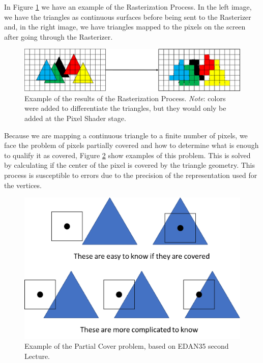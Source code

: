 \documentclass{cslthse-msc}
\begin{document}
In Figure \ref{fig:rasterizationproc} we have an example of the Rasterization Process. In the left image, we have the triangles as continuous surfaces before being sent to the Rasterizer and, in the right image, we have triangles mapped to the pixels on the screen after going through the Rasterizer.

\begin{figure}[!hbt]
	\centering
	\includegraphics[scale=0.75]{images/rasterization_process.png} 
	\caption{Example of the results of the Rasterization Process. 
		\emph{Note}: colors were added to differentiate the triangles, but they would only be added at the Pixel Shader stage.
	}\label{fig:rasterizationproc}
\end{figure}

Because we are mapping a continuous triangle to a finite number of pixels, we face the problem of pixels partially covered and how to determine what is enough to qualify it as covered, Figure \ref{fig:partialcover} show examples of this problem. This is solved by calculating if the center of the pixel is covered by the triangle geometry. This process is susceptible to errors due to the precision of the representation used for the vertices.  

\begin{figure}[!hbt]
	\centering
	\includegraphics[scale=0.5]{images/edge_testing.png} 
	\caption{Example of the Partial Cover problem, based on EDAN35 second Lecture. ~\cite{Doggett2017EDAN35}}\label{fig:partialcover}
\end{figure}
\end{document}
